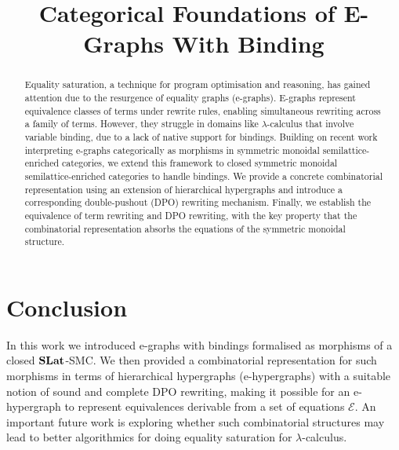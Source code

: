 \documentclass[acmsmall,screen, nonacm, review, anonymous, authoryear]{acmart}
\title{Categorical Foundations of E-Graphs With Binding}
\begin{document}
\begin{abstract}
	Equality saturation, a technique for program optimisation and reasoning, has gained attention due to the resurgence of equality graphs (e-graphs).
	E-graphs represent equivalence classes of terms under rewrite rules, enabling simultaneous rewriting across a family of terms.
	However, they struggle in domains like $\lambda$-calculus that involve variable binding, due to a lack of native support for bindings.
	Building on recent work interpreting e-graphs categorically as morphisms in symmetric monoidal semilattice-enriched categories, we extend this framework to closed symmetric monoidal semilattice-enriched categories to handle bindings.
	We provide a concrete combinatorial representation using an extension of hierarchical hypergraphs and introduce a corresponding double-pushout (DPO) rewriting mechanism.
	Finally, we establish the equivalence of term rewriting and DPO rewriting, with the key property that the combinatorial representation absorbs the equations of the symmetric monoidal structure.
\end{abstract}

\maketitle







\section{Conclusion}
In this work we introduced e-graphs with bindings formalised as morphisms of a closed $\mathbf{SLat}$-SMC.
We then provided a combinatorial representation for such morphisms in terms of hierarchical hypergraphs (e-hypergraphs) with a suitable notion of sound and complete DPO rewriting, making it possible for an e-hypergraph to represent equivalences derivable from a set of equations $\mathcal{E}$.
An important future work is exploring whether such combinatorial structures may lead to better algorithmics for doing equality saturation for $\lambda$-calculus.




\appendix


\end{document}
